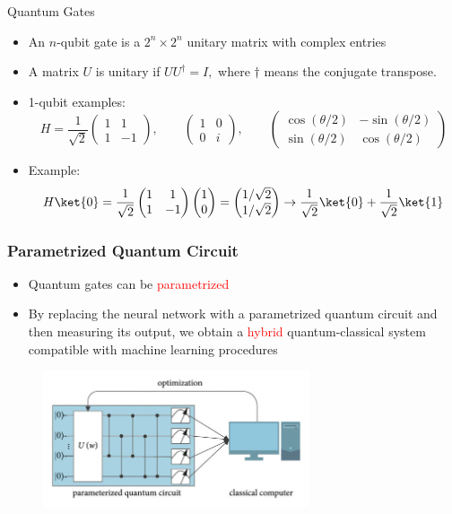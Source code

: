 \documentclass[xcolor=dvipsnames]{beamer}
\begin{document}
\begin{frame}{Quantum Gates}
  \begin{itemize}
    \item An $n$-qubit gate is a $2^n\times 2^n$ unitary matrix with complex entries
    \item A matrix $U$ is unitary if $UU^\dagger=I,$ where $\dagger$ means the conjugate transpose.
    \item 1-qubit examples:
    $$H=\frac{1}{\sqrt{2}}
    \begin{pmatrix}
      1 & 1\\
      1 & -1
    \end{pmatrix},\qquad
    \begin{pmatrix}
      1 & 0\\
      0 & i
    \end{pmatrix},\qquad 
    \begin{pmatrix}
      \cos(\theta/2) & -\sin(\theta/2)\\
      \sin(\theta/2) & \cos(\theta/2)
    \end{pmatrix}
    $$
    \item Example:
    $$H\ket{0}=\frac{1}{\sqrt{2}}
    \begin{pmatrix}
      1 & 1\\
      1 & -1
    \end{pmatrix}
    \begin{pmatrix}
      1\\
      0
    \end{pmatrix}=
    \begin{pmatrix}
      1/\sqrt{2}\\
      1/\sqrt{2}
    \end{pmatrix}\to\frac{1}{\sqrt{2}}\ket{0}+\frac{1}{\sqrt{2}}\ket{1}$$
  \end{itemize}
\end{frame}

\begin{frame}
  \frametitle{Parametrized Quantum Circuit}
  \begin{itemize}
    \item Quantum gates can be \textcolor{red}{parametrized}
    \item By replacing the neural network with a parametrized quantum circuit and then measuring its output, we obtain a \textcolor{red}{hybrid} quantum-classical system compatible with machine learning procedures
  \end{itemize}
  \begin{figure}
    \centering
    \includegraphics[width=0.7\textwidth]{pqc.png}
  \end{figure}
\end{frame}
\end{document}
